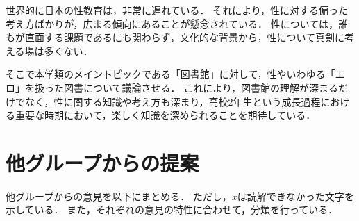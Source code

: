 \documentclass[uplatex,a4paper]{jsarticle}
\begin{document}
世界的に日本の性教育は，非常に遅れている．
それにより，性に対する偏った考え方ばかりが，広まる傾向にあることが懸念されている．
性については，誰もが直面する課題であるにも関わらず，文化的な背景から，性について真剣に考える場は多くない．

そこで本学類のメイントピックである「図書館」に対して，性やいわゆる「エロ」を扱った図書について議論させる．
これにより，図書館の理解が深まるだけでなく，性に関する知識や考え方も深まり，高校2年生という成長過程における重要な時期において，楽しく知識を深められることを期待している．


\section{他グループからの提案}
他グループからの意見を以下にまとめる．
ただし，$x$は読解できなかった文字を示している．
また，それぞれの意見の特性に合わせて，分類を行っている．
\end{document}
